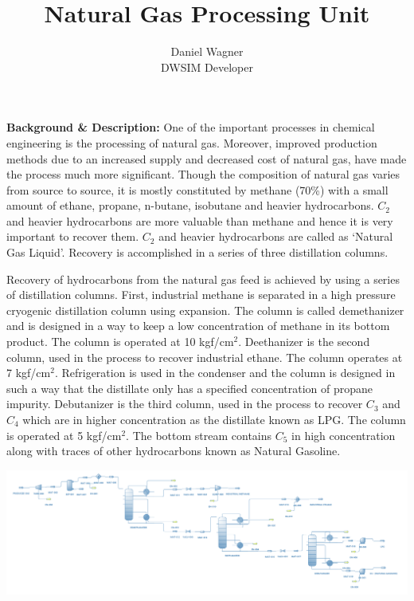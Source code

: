 \documentclass[a4paper,12pt]{article}
\title{Natural Gas Processing Unit}
\author{Daniel Wagner \\ DWSIM Developer}
\date{}
\begin{document}
\maketitle

\noindent \textbf{Background \& Description:}
\newline One of the important processes in chemical engineering is the processing of natural gas. Moreover, improved production methods due to an increased supply and decreased cost of natural gas, have made the process much more significant. Though the composition of natural gas varies from source to source, it is mostly constituted by methane (70\%) with a small amount of ethane, propane, n-butane, isobutane and heavier hydrocarbons. $C_2$ and heavier hydrocarbons are more valuable than methane and hence it is very important to recover them. $C_2$ and heavier hydrocarbons are called as ‘Natural Gas Liquid’. Recovery is accomplished in a series of three distillation columns. 

Recovery of hydrocarbons from the natural gas feed is achieved by using a series of distillation columns. First, industrial methane is separated in a high pressure cryogenic distillation column using expansion. The column is called demethanizer and is designed in a way to keep a low concentration of methane in its bottom product. The column is operated at 10 kgf/cm$^2$.
Deethanizer is the second column, used in the process to recover industrial ethane. The column operates at 7 kgf/cm$^2$. Refrigeration is used in the condenser and the column is designed in such a way that the distillate only has a specified concentration of propane impurity. 
Debutanizer is the third column, used in the process to recover $C_3$ and $C_4$ which are in higher concentration as the distillate known as LPG. The column is operated at 5 kgf/cm$^2$. The bottom stream contains $C_5$ in high concentration along with traces of other hydrocarbons known as Natural Gasoline.

\vspace{25mm}
\centerline{\includegraphics[width=1.15\linewidth]{Nat-Gas.png}}
\end{document}

